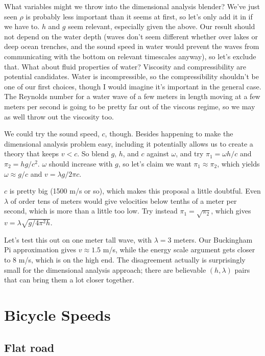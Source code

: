 \documentclass[12pt]{article}
\begin{document}
What variables might we throw into the dimensional analysis blender? We've just seen \(\rho\) is probably less important than it seems at first, so let's only add it in if we have to. \(h\) and \(g\) seem relevant, especially given the above. Our result should not depend on the water depth (waves don't seem different whether over lakes or deep ocean trenches, and the sound speed in water would prevent the waves from communicating with the bottom on relevant timescales anyway), so let's exclude that. What about fluid properties of water? Viscosity and compressibility are potential candidates. Water is incompressible, so the compressibility shouldn't be one of our first choices, though I would imagine it's important in the general case. The Reynolds number for a water wave of a few meters in length moving at a few meters per second is going to be pretty far out of the viscous regime, so we may as well throw out the viscosity too.

We could try the sound speed, \(c\), though. Besides happening to make the dimensional analysis problem easy, including it potentially allows us to create a theory that keeps \(v < c\). So blend \(g\), \(h\), and \(c\) against \(\omega\), and try \(\pi_1 = \omega h /c\) and \(\pi_2 = hg/c^2\). \(\omega\) should increase with \(g\), so let's claim we want \(\pi_1 \approx \pi_2\), which yields \(\omega \approx g/c\) and \(v=\lambda g/2\pi c\).

\(c\) is pretty big (1500 m/s or so), which makes this proposal a little doubtful. Even \(\lambda\) of order tens of meters would give velocities below tenths of a meter per second, which is more than a little too low. Try instead \(\pi_1 = \sqrt{\pi_2}\), which gives \(v = \lambda\sqrt{g/4\pi^2h}\).

Let's test this out on one meter tall wave, with \(\lambda = 3 \) meters. Our Buckingham Pi approximation gives \(v\approx 1.5\) m/s, while the energy scale argument gets closer to 8 m/s, which is on the high end. The disagreement actually is surprisingly small for the dimensional analysis approach; there are believable \((h,\lambda)\) pairs that can bring them a lot closer together. 

\section{Bicycle Speeds}

\subsection{Flat road}
\end{document}
